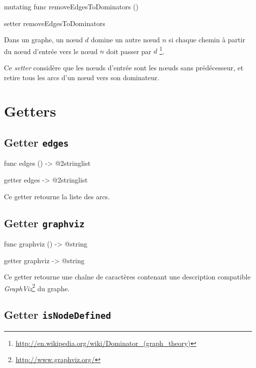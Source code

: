\begin{galgas4}
mutating func removeEdgesToDominators ()
\end{galgas4}

\begin{galgas4}
setter removeEdgesToDominators
\end{galgas4}

Dans un graphe, un nœud $d$ domine un autre nœud $n$ si chaque chemin à partir du nœud d'entrée vers le nœud $n$ doit passer par $d$ \footnote{\url{http://en.wikipedia.org/wiki/Dominator_(graph_theory)}}.

Ce \emph{setter} considère que les nœuds d'entrée sont les nœuds sans prédécesseur, et retire tous les arcs d'un nœud vers son dominateur.

\section{Getters}

\subsection{Getter \texttt{edges}}

\begin{galgas4}
func edges () -> @2stringlist
\end{galgas4}

\begin{galgas4}
getter edges -> @2stringlist
\end{galgas4}

Ce getter retourne la liste des arcs.


\subsection{Getter \texttt{graphviz}}

\begin{galgas4}
func graphviz () -> @string
\end{galgas4}

\begin{galgas4}
getter graphviz -> @string
\end{galgas4}

Ce getter retourne une chaîne de caractères contenant une description compatible \emph{GraphViz}\footnote{\url{http://www.graphviz.org/}} du graphe.



\subsection{Getter \texttt{isNodeDefined}}

